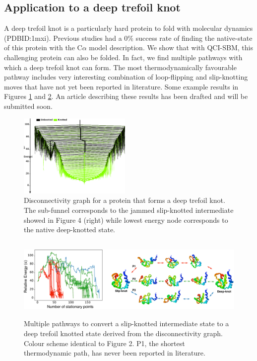 \documentclass[a4paper,11pt]{article}
\begin{document}
\subsection{Application to a deep trefoil knot}
A deep trefoil knot is a particularly hard protein to fold with molecular dynamics (PDBID:1mxi). Previous studies had a 0\% success rate of finding the native-state of this protein with the C$\alpha$ model description. We show that with QCI-SBM, this challenging protein can also be folded. In fact, we find multiple pathways with which a deep trefoil knot can form. The most thermodynamically favourable pathway includes very interesting combination of loop-flipping and slip-knotting moves that have not yet been reported in literature. Some example results in Figures \ref{fig:mxi20_1} and \ref{fig:mxi20_2}. An article describing these results has been drafted and will be submitted soon. 
\begin{figure}[htbp]
    \centering
    \includegraphics[height=4cm]{1mxi20.png}
    \caption{Disconnectivity graph for a protein that forms a deep trefoil knot. The sub-funnel corresponds to the jammed slip-knotted intermediate showed in Figure 4 (right) while lowest energy node corresponds to the native deep-knotted state.}
    \label{fig:mxi20_1}
\end{figure}

\begin{figure}[htbp]
    \centering
    \includegraphics[height=4cm]{1mxi20_kdfig.png}
    \caption{Multiple pathways to convert a slip-knotted intermediate state to a deep trefoil knotted state derived from the disconnectivity graph. Colour scheme identical to Figure 2. P1, the shortest thermodynamic path, has never been reported in literature.}
    \label{fig:mxi20_2}
\end{figure}
\end{document}
